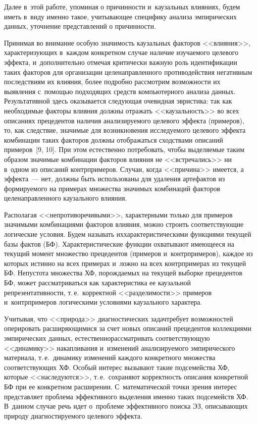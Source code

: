 \begin{multicols}{2}
  Далее в~этой работе, упоминая о причинности и~каузальных влияниях, будем 
иметь в~виду именно такое, учитывающее специфику анализа эмпирических 
данных, уточнение представлений о причинности.
  
  Принимая во внимание особую значимость каузальных факторов <<влияния>>, 
характеризующих в~каждом конкретном случае наличие изучаемого целевого 
эффекта, и~дополнительно отмечая критически важную роль идентификации таких 
факторов для организации целенаправленного противодействия негативным 
последствиям их влияния, более подробно рассмотрим возможности их выявления с~помощью подходящих средств компьютерного анализа данных. Результативной 
здесь оказывается следующая очевидная эвристика: так как необходимые факторы 
влияния должны отражать <<каузальность>> во всех описаниях прецедентов 
наличия анализируемого целевого эффекта (примеров), то, как следствие, 
значимые для возникновения исследуемого целевого эффекта комбинации таких 
факторов должны отображаться сходствами описаний примеров~[9, 10]. При этом 
естественно потребовать, чтобы выделяемые таким образом значимые 
комбинации факторов влияния не <<встречались>> ни в~одном из описаний 
контрпримеров. Случаи, когда <<причина>> имеется, а эффекта~--- нет, должны 
быть использованы для удаления артефактов из формируемого на примерах 
множества значимых комбинаций факторов целенаправленного каузального 
влияния.
  
  Располагая <<непротиворечивыми>>, харак\-тер\-ными только для примеров 
значимыми комбинациями факторов влияния, можно строить соответствующие 
логические условия. Будем называть их\linebreak характеристическими функциями  
текущей базы фактов (БФ). Характеристические функции охватывают имеющееся на текущий момент 
множество прецедентов (примеров и~контрпримеров), каждое из которых истинно 
на всех примерах и~ложно на всех контрпримерах из текущей БФ. Непустота 
множества ХФ, порождаемых на текущей выборке прецедентов БФ, может 
рассматриваться как характеристика ее каузальной репрезентативности, т.\,е.\ 
корректной <<разделимости>> примеров и~контрпримеров логическими 
условиями каузального характера.
  
  Учитывая, что <<природа>> диагностических задач\linebreak требует возможностей 
оперировать расширя\-ющимися за счет новых описаний прецедентов коллекциями 
эмпирических данных, естественно\linebreak рас\-смат\-ри\-вать соответствующую 
<<динамику>> накапливания и~изменений анализируемого эмпирического 
материала, т.\,е.\ динамику изменений каж\-до\-го конкретного множества 
соответствующих ХФ. Особый интерес вызывают такие подсемейства ХФ, 
которые <<наследуются>>, т.\,е.\ сохраняют корректность описания конкретной 
БФ при ее конкретном расширении. С~математической точки зрения интерес 
представляет проб\-ле\-ма эффективного выделения именно таких подсемейств ХФ. 
В~данном случае речь идет о~проб\-ле\-ме эффективного поиска ЭЗ, 
описывающих природу диагностируемого целевого эффекта.
  

\end{multicols}
